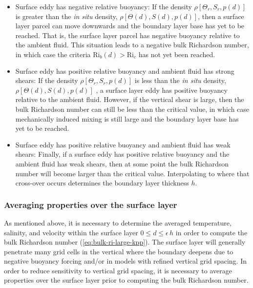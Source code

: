 \begin{itemize}

\item {\sc Surface eddy has negative relative buoyancy}: If the
  density $\rho[\Theta_{r}, S_{r}, p(d)]$ is greater than the {\it in
    situ} density, $\rho[\Theta(d), S(d), p(d)]$, then a surface layer
  parcel can move downwards and the boundary layer base has yet to be
  reached.  That is, the surface layer parcel has negative buoyancy
  relative to the ambient fluid.  This situation leads to a negative
  bulk Richardson number, in which case the criteria $\mbox{Ri}_{b}(d)
  > \mbox{Ri}_{c}$ has not yet been reached.

\item {\sc Surface eddy has positive relative buoyancy and ambient
    fluid has strong shears}: If the density $\rho[\Theta_{r}, S_{r},
  p(d)]$ is less than the {\it in situ} density, $\rho[\Theta(d),
  S(d), p(d)]$ , a surface layer eddy has positive buoyancy relative
  to the ambient fluid.  However, if the vertical shear is large, then
  the bulk Richardson number can still be less than the critical
  value, in which case mechanically induced mixing is still large and
  the boundary layer base has yet to be reached.

\item {\sc Surface eddy has positive relative buoyancy and ambient
    fluid has weak shears}: Finally, if a surface eddy has positive
  relative buoyancy and the ambient fluid has weak shears, then at
  some point the bulk Richardson number will become larger than the
  critical value.  Interpolating to where that cross-over occurs
  determines the boundary layer thickness $h$.  

\end{itemize}


\subsubsection{Averaging properties over the surface layer}
\label{subsubsection:averaging-over-surface-layer}

As mentioned above, it is necessary to determine the averaged
temperature, salinity, and velocity within the surface layer $0 \le d
\le \epsilon \, h$ in order to compute the bulk Richardson number
(\ref{eq:bulk-ri-large-kpp}).  The surface layer will generally
penetrate many grid cells in the vertical where the boundary deepens
due to negative buoyancy forcing and/or in models with refined
vertical grid spacing.  In order to reduce sensitivity to vertical
grid spacing, it is necessary to average properties over the surface
layer prior to computing the bulk Richardson number.

